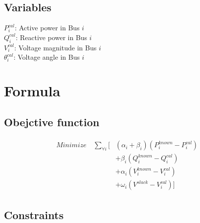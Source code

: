 \documentclass{article}
\begin{document}
\subsection{Variables}
$P^{cal}_{i}$: Active power in Bus $i$\\
$Q^{cal}_{i}$: Reactive power in Bus $i$\\
$V^{cal}_{i}$: Voltage magnitude in Bus $i$\\
$\theta^{cal}_{i}$: Voltage angle in Bus $i$\\

\newpage
\section{Formula}

\subsection{Obejctive function}
\begin{align}
    \begin{split}
        Minimize \quad \sum_{\forall i}\bigg[  & (\alpha_{i} + \beta_{i})(P^{known}_{i} - P^{cal}_{i})\\
                                    & + \beta_{i}(Q^{known}_{i} - Q^{cal}_{i}) \\
                                    & +\alpha_{i}(V^{known}_{i} - V^{cal}_{i}) \\
                                    & +\omega_{i}(V^{slack} - V^{cal}_{i}) \bigg]
    \end{split}
\end{align}

\subsection{Constraints}
\end{document}
